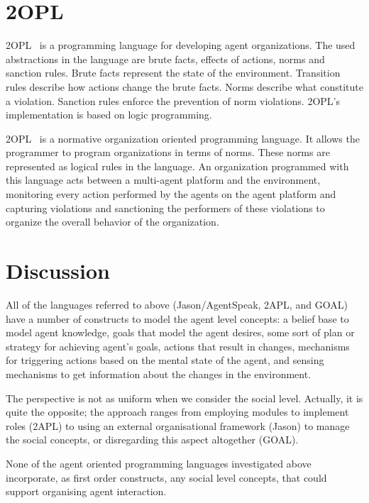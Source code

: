 \documentclass[a4paper,12pt,oneside,fleqn]{book} %
\begin{document}

\section{2OPL} %

2OPL~\cite{DBLP:conf/atal/DybalovaTDL13} is a programming language for
developing agent organizations.  The used abstractions in the language are
brute facts, effects of actions, norms and sanction rules. Brute facts
represent the state of the environment.  Transition rules describe how
actions change the brute facts. Norms describe what constitute a violation.
Sanction rules enforce the prevention of norm violations. 2OPL's
implementation is based on logic programming.

2OPL~\cite{DBLP:conf/atal/DybalovaTDL13} is a normative organization
oriented programming language. It allows the programmer to program
organizations in terms of norms. These norms are represented as logical
rules in the language. An organization programmed with this language acts
between a multi-agent platform and the environment, monitoring every action
performed by the agents on the agent platform and capturing violations and
sanctioning the performers of these violations to organize the overall
behavior of the organization.


\section{Discussion} %

All of the languages referred to above (Jason/AgentSpeak, 2APL, and GOAL)
have a number of constructs to model the agent level concepts: a belief
base to model agent knowledge, goals that model the agent desires, some
sort of plan or strategy for achieving agent's goals, actions that
result in changes, mechanisms for triggering actions based on the mental
state of the agent, and sensing mechanisms to get information about the changes
in the environment.

The perspective is not as uniform when we consider the social level.
Actually, it is quite the opposite; the approach ranges from employing
modules to implement roles (2APL) to using an external organisational framework
(Jason) to manage the social concepts, or disregarding this aspect
altogether (GOAL).

None of the agent oriented programming languages investigated above
incorporate, as first order constructs, any social level concepts, that
could support organising agent interaction.
\end{document}
